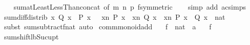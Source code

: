 \begin{isabellebody}
%
\isadelimproof
\ \ %
\endisadelimproof
%
\isatagproof
{}\isamarkupfalse%
\ sum{\isachardot}{\kern0pt}atLeastLessThan{\isacharunderscore}{\kern0pt}concat\ {\isacharbrackleft}{\kern0pt}of\ m\ n\ p\ f{\isacharcomma}{\kern0pt}symmetric{\isacharbrackright}{\kern0pt}\isanewline
\ \ \isamarkupfalse%
\ {\isacharparenleft}{\kern0pt}simp\ add{\isacharcolon}{\kern0pt}\ ac{\isacharunderscore}{\kern0pt}simps{\isacharparenright}{\kern0pt}%
\endisatagproof
{\isafoldproof}%
%
\isadelimproof
\isanewline
%
\endisadelimproof
\isanewline
{}\isamarkupfalse%
\ sum{\isacharunderscore}{\kern0pt}diff{\isacharunderscore}{\kern0pt}distrib{\isacharcolon}{\kern0pt}\ {\isachardoublequoteopen}{\isasymforall}x{\isachardot}{\kern0pt}\ Q\ x\ {\isasymle}\ P\ x\ \ {\isasymLongrightarrow}\ {\isacharparenleft}{\kern0pt}{\isasymSum}x{\isacharless}{\kern0pt}n{\isachardot}{\kern0pt}\ P\ x{\isacharparenright}{\kern0pt}\ {\isacharminus}{\kern0pt}\ {\isacharparenleft}{\kern0pt}{\isasymSum}x{\isacharless}{\kern0pt}n{\isachardot}{\kern0pt}\ Q\ x{\isacharparenright}{\kern0pt}\ {\isacharequal}{\kern0pt}\ {\isacharparenleft}{\kern0pt}{\isasymSum}x{\isacharless}{\kern0pt}n{\isachardot}{\kern0pt}\ P\ x\ {\isacharminus}{\kern0pt}\ Q\ x\ {\isacharcolon}{\kern0pt}{\isacharcolon}{\kern0pt}\ nat{\isacharparenright}{\kern0pt}{\isachardoublequoteclose}\isanewline
%
\isadelimproof
\ \ %
\endisadelimproof
%
\isatagproof
{}\isamarkupfalse%
\ {\isacharparenleft}{\kern0pt}subst\ sum{\isacharunderscore}{\kern0pt}subtractf{\isacharunderscore}{\kern0pt}nat{\isacharparenright}{\kern0pt}\ auto%
\endisatagproof
{\isafoldproof}%
%
\isadelimproof
%
\endisadelimproof
%
\isadelimdocument
%
\endisadelimdocument
%
\isatagdocument
%
\isamarkuptrue%
%
\endisatagdocument
{\isafolddocument}%
%
\isadelimdocument
%
\endisadelimdocument
{}\isamarkupfalse%
\ comm{\isacharunderscore}{\kern0pt}monoid{\isacharunderscore}{\kern0pt}add\isanewline
{}\isanewline
\isanewline
{}\isamarkupfalse%
\isanewline
\ \ \ f\ {\isacharcolon}{\kern0pt}{\isacharcolon}{\kern0pt}\ {\isachardoublequoteopen}nat\ {\isasymRightarrow}\ {\isacharprime}{\kern0pt}a{\isachardoublequoteclose}\isanewline
\ \ \ {\isachardoublequoteopen}f\ {}\ {\isacharequal}{\kern0pt}\ {}{\isachardoublequoteclose}\isanewline
{}\isanewline
\isanewline
{}\isamarkupfalse%
\ sum{\isacharunderscore}{\kern0pt}shift{\isacharunderscore}{\kern0pt}lb{\isacharunderscore}{\kern0pt}Suc{}{\isacharunderscore}{\kern0pt}{}{\isacharunderscore}{\kern0pt}upt{\isacharcolon}{\kern0pt}\isanewline

\end{isabellebody}
